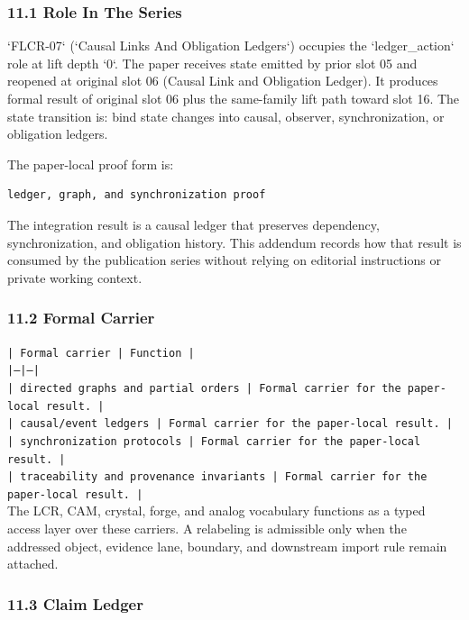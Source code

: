 \documentclass[11pt]{article}
\begin{document}
\subsubsection*{11.1 Role In The Series}

`FLCR-07` (`Causal Links And Obligation Ledgers`) occupies the `ledger\_action` role at lift depth `0`.
The paper receives state emitted by prior slot 05 and reopened at original slot 06 (Causal Link and Obligation Ledger). It produces formal result of original slot 06 plus the same-family lift path toward slot 16. The state transition is:
bind state changes into causal, observer, synchronization, or obligation ledgers.

The paper-local proof form is:

\begin{verbatim}
ledger, graph, and synchronization proof
\end{verbatim}

The integration result is a causal ledger that preserves dependency, synchronization, and obligation history. This addendum records how that result is
consumed by the publication series without relying on editorial instructions or
private working context.

\subsubsection*{11.2 Formal Carrier}

\noindent\texttt{| Formal carrier | Function |}\\
\noindent\texttt{|---|---|}\\
\noindent\texttt{| directed graphs and partial orders | Formal carrier for the paper-local result. |}\\
\noindent\texttt{| causal/event ledgers | Formal carrier for the paper-local result. |}\\
\noindent\texttt{| synchronization protocols | Formal carrier for the paper-local result. |}\\
\noindent\texttt{| traceability and provenance invariants | Formal carrier for the paper-local result. |}\\

The LCR, CAM, crystal, forge, and analog vocabulary functions as a typed access
layer over these carriers. A relabeling is admissible only when the addressed
object, evidence lane, boundary, and downstream import rule remain attached.

\subsubsection*{11.3 Claim Ledger}
\end{document}
